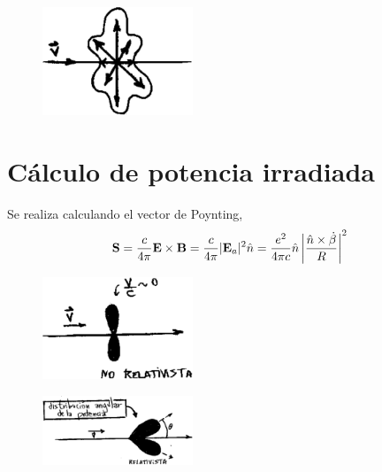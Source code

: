 \documentclass[10pt,oneside]{CBFT_book}
\begin{document}
\begin{figure}[htb]
	\begin{center}
	\includegraphics[width=0.4\textwidth]{images/fig_ft1_campo_carga_mov.pdf}	 
	\end{center}
	\caption{}
\end{figure}

\section{Cálculo de potencia irradiada}

Se realiza calculando el vector de Poynting,
\[
	\vb{S} = \frac{c}{4\pi} \pv{E}{B} = \frac{c}{4\pi} |\vb{E}_a|^2 \hat{n} =  \frac{e^2}{4\pi c}
		\hat{n} \left| \frac{\hat{n} \times \dot{\vb{\beta}} }{R} \right|^2
\]

\begin{figure}[htb]
	\begin{center}
	\includegraphics[width=0.4\textwidth]{images/fig_ft1_frenado2.pdf}	 
	\end{center}
	\caption{}
\end{figure} 

\begin{figure}[htb]
	\begin{center}
	\includegraphics[width=0.4\textwidth]{images/fig_ft1_frenado3.pdf}	 
	\end{center}
	\caption{}
\end{figure} 
\end{document}
